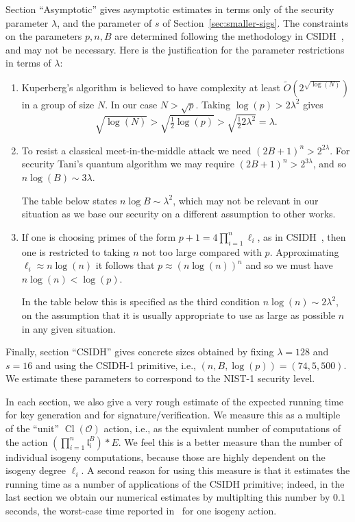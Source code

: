 \documentclass{llncs}
\newcommand{\OO}{\mathcal{O}}
\DeclareMathOperator{\Cl}{Cl}
\renewcommand{\l}{\mathfrak{l}}
\begin{document}
Section ``Asymptotic'' gives asymptotic estimates in terms only of the security parameter $\lambda$, and the parameter of $s$ of Section~\ref{sec:smaller-sigs}.
The constraints on the parameters $p,n,B$ are determined following the methodology in CSIDH~\cite{CLMPR18}, and may not be necessary.
Here is the justification for the parameter restrictions in terms of $\lambda$:
\begin{enumerate}
\item Kuperberg's algorithm is believed to have complexity at least $\tilde{O}( 2^{\sqrt{\log(N)}} )$ in a group of size $N$. In our case $N > \sqrt{p}$. Taking $\log(p) > 2 \lambda^2$ gives 
\[
   \sqrt{ \log(N)} > \sqrt{ \tfrac{1}{2} \log(p) } > \sqrt{ \tfrac{1}{2} 2 \lambda^2 } = \lambda.
\]
\item 
To resist a classical meet-in-the-middle attack we need $(2B+1)^n > 2^{2 \lambda}$.
For security Tani's quantum algorithm we may require $(2B+1)^n > 2^{3 \lambda}$, and so $n \log(B) \sim 3 \lambda$.

The table below states  $n\log B\sim \lambda^2$, which may not be relevant in our situation as we base our security on a different assumption to other works.


\item If one is choosing primes of the form $p+1 = 4\prod_{i=1}^n\ell_i$, as in CSIDH~\cite{CLMPR18}, then one is restricted to taking $n$ not too large compared with $p$.
Approximating $\ell_i \approx n \log(n)$ it follows that $p \approx (n \log(n))^n$ and so we must have $n \log(n) < \log(p)$.

In the table below this is specified as the third condition $n \log(n) \sim 2 \lambda^2$, on the assumption that it is usually appropriate to use as large as possible $n$ in any given situation.
\end{enumerate}

Finally, section ``CSIDH'' gives concrete sizes obtained by fixing $\lambda=128$ and $s=16$ and using the CSIDH-1 primitive, i.e., $(n,B,\log(p)) = (74,5,500)$.
We estimate these parameters to correspond to the NIST-1 security level.

In each section, we also give a very rough estimate of the expected running time for key generation and for signature/verification.
We measure this as a multiple of the ``unit'' $\Cl(\OO)$ action, i.e., as the equivalent number of computations of the action $(\prod_{i=1}^n\l_i^B)*E$.
We feel this is a better measure than the number of individual isogeny computations, because those are highly dependent on the isogeny degree $\ell_i$.
A second reason for using this measure is that it estimates the running time as a number of applications of the CSIDH primitive; indeed, in the last section we obtain our numerical estimates by multiplting this number by $0.1$ seconds, the worst-case time reported in~\cite{CLMPR18} for one isogeny action.
\end{document}
